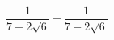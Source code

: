 \begin{ex}[type=calculate]
	\begin{condition}
		\( \dfrac{1}{7+2\sqrt{6}}+\dfrac{1}{7-2\sqrt{6}} \)
	\end{condition}
\end{ex}